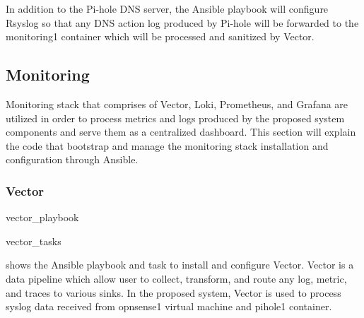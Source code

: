\documentclass[../index.tex]{subfiles}
\begin{document}
In addition to the Pi-hole DNS server, the Ansible playbook will configure Rsyslog so that any DNS
action log produced by Pi-hole will be forwarded to the monitoring1 container which will be
processed and sanitized by Vector.

\subsection{Monitoring}

Monitoring stack that comprises of Vector, Loki, Prometheus, and Grafana are utilized in order to
process metrics and logs produced by the proposed system components and serve them as a centralized
dashboard. This section will explain the code that bootstrap and manage the monitoring stack
installation and configuration through Ansible.


\subsubsection{Vector}

{vector_playbook}

{vector_tasks}

 shows the Ansible playbook and task to install and
configure Vector. Vector is a data pipeline which allow user to collect, transform, and route any
log, metric, and traces to various sinks. In the proposed system, Vector is used to process syslog
data received from opnsense1 virtual machine and pihole1 container.
\end{document}
